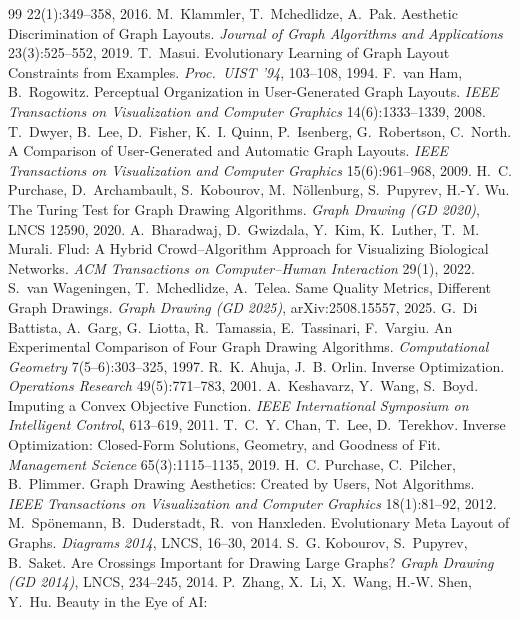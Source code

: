 \documentclass[a4paper,UKenglish]{gd-lipics-v3}
\begin{document}
\begin{thebibliography}{99}
 22(1):349--358, 2016.
 M.~Klammler, T.~Mchedlidze, A.~Pak. Aesthetic Discrimination of Graph
 Layouts. \emph{Journal of Graph Algorithms and Applications} 23(3):525--552, 2019.
 T.~Masui. Evolutionary Learning of Graph Layout Constraints from
 Examples. \emph{Proc.\ UIST '94}, 103--108, 1994.
 F.~van Ham, B.~Rogowitz. Perceptual Organization in User-Generated Graph
 Layouts. \emph{IEEE Transactions on Visualization and Computer Graphics} 14(6):1333--1339,
 2008.
 T.~Dwyer, B.~Lee, D.~Fisher, K.~I. Quinn, P.~Isenberg, G.~Robertson,
 C.~North. A Comparison of User-Generated and Automatic Graph Layouts. \emph{IEEE
 Transactions on Visualization and Computer Graphics} 15(6):961--968, 2009.
 H.~C. Purchase, D.~Archambault, S.~Kobourov, M.~N\"ollenburg,
 S.~Pupyrev, H.-Y. Wu. The Turing Test for Graph Drawing Algorithms. \emph{Graph Drawing
 (GD 2020)}, LNCS 12590, 2020.
 A.~Bharadwaj, D.~Gwizdala, Y.~Kim, K.~Luther, T.~M. Murali. Flud: A Hybrid
 Crowd--Algorithm Approach for Visualizing Biological Networks. \emph{ACM Transactions on
 Computer--Human Interaction} 29(1), 2022.
 S.~van Wageningen, T.~Mchedlidze, A.~Telea. Same Quality Metrics,
 Different Graph Drawings. \emph{Graph Drawing (GD 2025)}, arXiv:2508.15557, 2025.
 G.~Di Battista, A.~Garg, G.~Liotta, R.~Tamassia, E.~Tassinari, F.~Vargiu.
 An Experimental Comparison of Four Graph Drawing Algorithms. \emph{Computational
 Geometry} 7(5--6):303--325, 1997.
 R.~K. Ahuja, J.~B. Orlin. Inverse Optimization. \emph{Operations
 Research} 49(5):771--783, 2001.
 A.~Keshavarz, Y.~Wang, S.~Boyd. Imputing a Convex Objective Function.
 \emph{IEEE International Symposium on Intelligent Control}, 613--619, 2011.
 T.~C.~Y. Chan, T.~Lee, D.~Terekhov. Inverse Optimization: Closed-Form
 Solutions, Geometry, and Goodness of Fit. \emph{Management Science} 65(3):1115--1135,
 2019.
 H.~C. Purchase, C.~Pilcher, B.~Plimmer. Graph Drawing Aesthetics:
 Created by Users, Not Algorithms. \emph{IEEE Transactions on Visualization and Computer
 Graphics} 18(1):81--92, 2012.
 M.~Sp\"onemann, B.~Duderstadt, R.~von Hanxleden. Evolutionary Meta
 Layout of Graphs. \emph{Diagrams 2014}, LNCS, 16--30, 2014.
 S.~G. Kobourov, S.~Pupyrev, B.~Saket. Are Crossings Important for
 Drawing Large Graphs? \emph{Graph Drawing (GD 2014)}, LNCS, 234--245, 2014.
 P.~Zhang, X.~Li, X.~Wang, H.-W. Shen, Y.~Hu. Beauty in the Eye of AI:

\end{thebibliography}
\end{document}
